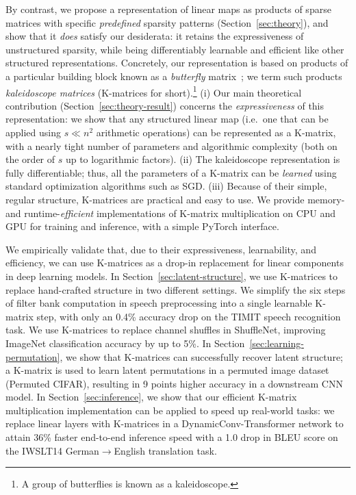 By contrast, we propose a representation of linear maps as products of sparse matrices with specific \textit{predefined} sparsity patterns (Section~\ref{sec:theory}),
and show that it \textit{does} satisfy our desiderata: it retains the expressiveness of unstructured sparsity, while being differentiably learnable and efficient like other structured representations. Concretely, our representation is based on products of a particular building block known as a \textit{butterfly} matrix~\citep{parker1995random, dao2019learning}; we term such products
\textit{kaleidoscope matrices} (K-matrices for short).\footnote{A group of butterflies is known as a kaleidoscope.} (i) Our main theoretical contribution (Section~\ref{sec:theory-result}) concerns the \textit{expressiveness} of this representation: we show that any structured linear map (i.e.\ one that can be applied using $s \ll n^2$ arithmetic operations) can be represented as a K-matrix, with a nearly tight number of parameters and algorithmic complexity (both on the order of $s$ up to logarithmic factors). (ii) The kaleidoscope representation is fully differentiable; thus, all the parameters of a K-matrix can be \textit{learned}
using standard optimization algorithms such as SGD. (iii) Because of their simple, regular structure, K-matrices are practical and easy to use. We provide memory- and runtime-\textit{efficient} implementations of K-matrix multiplication on CPU and GPU for training and inference, with a simple PyTorch interface.

We empirically validate that, due to their expressiveness, learnability, and efficiency, we can use K-matrices as a drop-in replacement for linear components in deep learning models. In Section~\ref{sec:latent-structure}, we use K-matrices to replace hand-crafted structure in two different settings. We simplify the six steps of filter bank computation in speech preprocessing into a single learnable K-matrix step, with only an 0.4\% accuracy drop on the TIMIT speech recognition task. We use K-matrices to replace channel shuffles in ShuffleNet, improving ImageNet classification accuracy by up to 5\%.
In Section~\ref{sec:learning-permutation}, we show that K-matrices can successfully recover latent structure; a K-matrix is used to learn latent permutations in a permuted image dataset (Permuted CIFAR), resulting in 9 points higher accuracy in a downstream CNN model. In Section~\ref{sec:inference}, we show that our efficient K-matrix multiplication implementation can be applied to speed up real-world tasks: we replace linear layers with K-matrices in a DynamicConv-Transformer network to attain 36\% faster end-to-end inference speed with a 1.0 drop in BLEU score on the IWSLT14 German$\rightarrow$English translation task.

